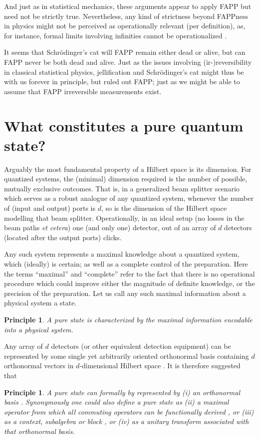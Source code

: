 \documentclass[%
  preprint,
 showpacs,
 showkeys,
 preprintnumbers,
 amsmath,amssymb,
 aps,
   pra,
  longbibliography,
 ]{revtex4-1}
\newtheorem{conjecture}[question]{Principle}
\begin{document}
And just as in statistical mechanics, these arguments appear to apply FAPP but need not be strictly true.
Nevertheless, any kind of strictness beyond FAPPness in physics might not be perceived as operationally relevant (per definition),
as, for instance, formal limits involving infinities cannot be operationalized \cite{bridgman,gandy1}.


It seems that  Schr\"odinger's cat will FAPP remain either dead or alive, but can FAPP never be both dead and alive.
Just as the issues involving (ir-)reversibility in classical statistical physics,
jellification and Schr\"odinger's cat  might thus be with us forever in principle, but ruled out FAPP;
just as we might be able to assume that FAPP irreversible measurements exist.


\section{What constitutes a pure quantum state?}

Arguably the most fundamental property of a Hilbert space is its dimension.
For quantized systems, the (minimal) dimension required is the number of possible, mutually exclusive outcomes.
That is, in a generalized beam splitter scenario \cite{rzbb} which serves as a robust analogue of any quantized system,
whenever the number of (input and output) ports is $d$, so is the dimension of the Hilbert space modelling that beam splitter.
Operationally, in an ideal setup (no losses in the beam paths {\it et cetera}) one (and only one) detector, out of an array of $d$ detectors
(located after the output ports) clicks.

Any such system represents a maximal knowledge about a quantized system, which (ideally) is certain;
as well as a complete control of the preparation.
Here the terms ``maximal'' and ``complete'' refer to the fact that there is no operational procedure which could improve either the magnitude of definite knowledge,
or the precision of the preparation. Let us call any such maximal information about a physical system a state.

{\color{blue} \begin{conjecture}
A pure state is characterized by
the maximal information encodable into a physical system.
\end{conjecture}   }

Any array of $d$ detectors (or other equivalent detection equipment) can be represented by some single yet arbitrarily oriented orthonormal basis
containing $d$ orthonormal vectors in $d$-dimensional Hilbert space  \cite{Schwinger.60}.
It is therefore suggested that
{\color{blue} \begin{conjecture}
A pure state can formally by represented by
(i) an orthonormal basis \cite{svozil-2002-statepart-prl}.
Synonymously one could also define a pure state as
(ii) a {\em maximal operator}  from which all commuting operators can be functionally derived
\cite[sect.~84]{halmos-vs}, or
(iii) as a {\em context, subalgebra} or {\em block} \cite{svozil-2006-omni,svozil-2008-ql}, or
(iv) as a unitary transform associated with that orthonormal basis.
\end{conjecture}   }
\end{document}

